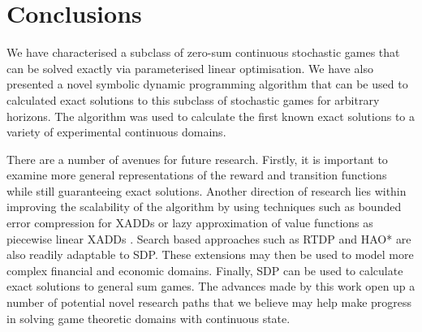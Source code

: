 \section{Conclusions}
\label{sec:conclusion}


We have characterised a subclass of zero-sum continuous stochastic
games that can be solved exactly via parameterised linear optimisation.
We have also presented a novel symbolic dynamic programming 
algorithm that can be used to calculated exact solutions to this subclass
of stochastic games for arbitrary horizons. The algorithm
was used to calculate the first known exact solutions to a variety of 
experimental continuous domains.

%

There are a number of avenues for future research. Firstly, it is important
to examine more general representations of the reward and transition functions while
still guaranteeing exact solutions. Another direction of research lies within
improving the scalability of the algorithm by using techniques such as 
bounded error compression for XADDs \cite{Vianna_UAI_2013} or lazy 
approximation of value functions as piecewise linear XADDs \cite{Li_AAAI_2005}. 
Search based approaches such as RTDP \cite{Barto_AI_1995} and HAO* \cite{Meuleau_JoAIR_2009}
are also readily adaptable to SDP. These extensions may then be used to 
model more complex financial and economic domains. Finally, SDP can be
used to calculate exact solutions to general sum games. The advances
made by this work open up a number of potential novel research paths
that we believe may help make progress in solving game theoretic domains
with continuous state.
